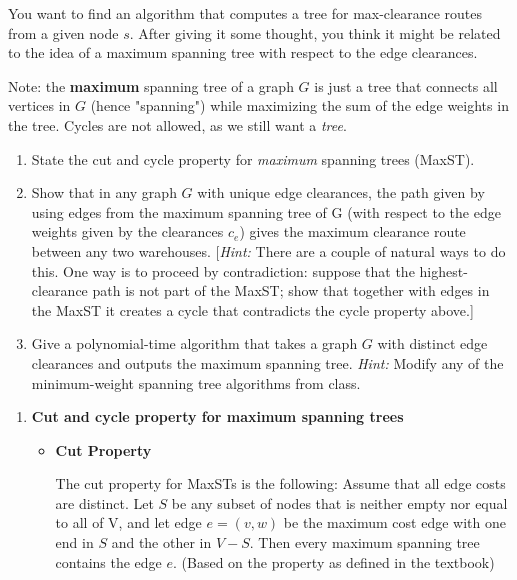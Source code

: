 \documentclass[letterpaper,11pt]{article}
\begin{document}
\begin{enumerate}
    You want to find an algorithm that computes a tree for max-clearance routes from a given node $s$. After giving it some thought, you think it might be related to the idea of a maximum spanning tree with respect to the edge clearances.
    
    Note: the \textbf{maximum} spanning tree of a graph $G$ is just a tree that connects all vertices in $G$ (hence "spanning") while maximizing the sum of the edge weights in the tree. Cycles are not allowed, as we still want a \emph{tree}.
   
    
    \begin{enumerate}
        \item State the cut and  cycle property for \textit{maximum} spanning trees (MaxST). 
    
        \item Show that in any graph $G$ with unique edge clearances, the path given by using edges from the maximum spanning tree of G (with respect to the edge weights given by the clearances $c_e$) gives the maximum clearance route between any two warehouses. [\textit{Hint:} There are a couple of natural ways to do this. One way is to proceed by contradiction: suppose that the highest-clearance path is not part of the MaxST; show that together with edges in the MaxST it creates a cycle that contradicts the cycle property above.]
        
        \item Give a polynomial-time algorithm that takes a graph $G$ with distinct edge clearances and outputs the maximum spanning tree. \emph{Hint:} Modify any of the minimum-weight spanning tree algorithms from class.
    \end{enumerate}

    \begin{enumerate}
        \color{teal}
        \item \textbf{Cut and cycle property for maximum spanning trees}
            \begin{itemize}
                \item \textbf{Cut Property}

                    The cut property for MaxSTs is the following: Assume that 
                    all edge costs are distinct. Let $S$ be any subset of nodes
                    that is neither empty nor equal to all of V, and let edge
                    $e = (v, w)$ be the maximum cost edge with one end in $S$ 
                    and the other in $V - S$. Then every maximum spanning tree 
                    contains the edge $e$. (Based on the property as defined 
                    in the textbook)


\end{itemize}
\end{enumerate}
\end{enumerate}
\end{document}

